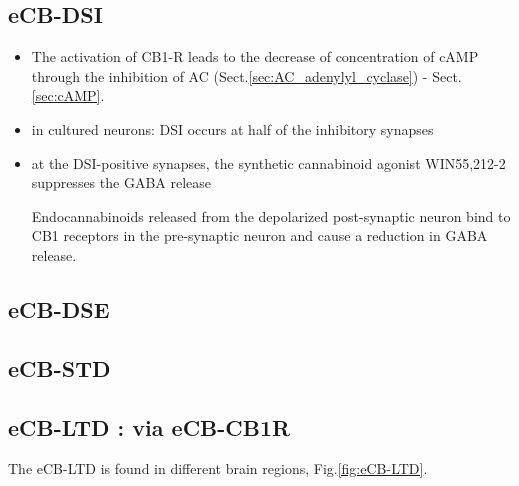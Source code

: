 \subsection{eCB-DSI}
\label{sec:eCB-DSI}


\begin{itemize}
  
 \item The activation of CB1-R leads to the decrease of concentration of cAMP
 through the inhibition of AC (Sect.\ref{sec:AC_adenylyl_cyclase}) - 
 Sect.\ref{sec:cAMP}.

  \item in cultured neurons: DSI occurs at half of the inhibitory synapses

  \item at the DSI-positive synapses, the synthetic cannabinoid agonist
  WIN55,212-2 suppresses the GABA release

Endocannabinoids released from the depolarized post-synaptic neuron bind to CB1
receptors in the pre-synaptic neuron and cause a reduction in GABA release. 

\end{itemize}

\subsection{eCB-DSE}
\label{sec:eCB-DSE}

\subsection{eCB-STD}
\label{sec:eCB-STD}

\subsection{eCB-LTD : via eCB-CB1R}
\label{sec:eCB-LTD}

The eCB-LTD is found in different brain regions, Fig.\ref{fig:eCB-LTD}. 

